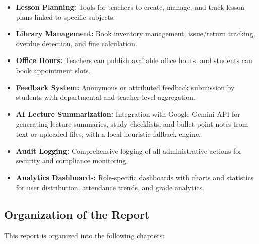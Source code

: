 \begin{itemize}[leftmargin=2em]
    \item \textbf{Lesson Planning:} Tools for teachers to create, manage, and track lesson plans linked to specific subjects.
    
    \item \textbf{Library Management:} Book inventory management, issue/return tracking, overdue detection, and fine calculation.
    
    \item \textbf{Office Hours:} Teachers can publish available office hours, and students can book appointment slots.
    
    \item \textbf{Feedback System:} Anonymous or attributed feedback submission by students with departmental and teacher-level aggregation.
    
    \item \textbf{AI Lecture Summarization:} Integration with Google Gemini API for generating lecture summaries, study checklists, and bullet-point notes from text or uploaded files, with a local heuristic fallback engine.
    
    \item \textbf{Audit Logging:} Comprehensive logging of all administrative actions for security and compliance monitoring.
    
    \item \textbf{Analytics Dashboards:} Role-specific dashboards with charts and statistics for user distribution, attendance trends, and grade analytics.
\end{itemize}

\subsection{Organization of the Report}

This report is organized into the following chapters:

